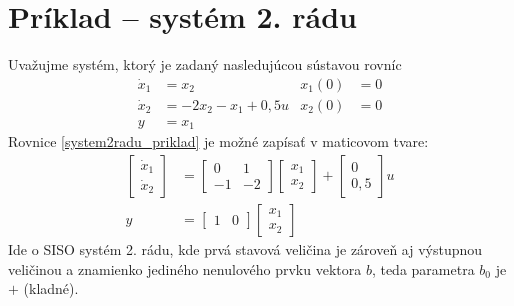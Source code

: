 \documentclass[a4paper, 10pt, ]{article}
\begin{document}
\section{Príklad -- systém 2. rádu}


Uvažujme systém, ktorý je zadaný nasledujúcou sústavou rovníc
\begin{subequations} \label{system2radu_priklad}
\begin{align}
	\dot x_1 &= x_2  &  x_1(0) &=0 \\
	\dot x_2 &= -2 x_2 - x_1 + 0,5 u &  x_2(0)&=0 \\
	y &= x_1
\end{align}
\end{subequations}
Rovnice \eqref{system2radu_priklad} je možné zapísať v maticovom tvare:
\begin{subequations} \label{maticformasystemu2r_priklad}
	\begin{align}
	\begin{bmatrix}
	 		\dot x_1  \\
	 		\dot x_2
	 \end{bmatrix}
	 &=
	 \begin{bmatrix}
	 		0 & 1 \\
	 		-1 & -2
	 \end{bmatrix}
	 \begin{bmatrix}
	 		x_1  \\
	 		x_2
	 \end{bmatrix}
	 +
	 \begin{bmatrix}
	 		0  \\
	 		0,5
	 \end{bmatrix}
	 u
	 \\
	 y
	 &=
	 \begin{bmatrix}
	 		1  &
	 		0
	 \end{bmatrix}
	 \begin{bmatrix}
	 		x_1  \\
	 		x_2
	 \end{bmatrix}
	\end{align}
\end{subequations}
Ide o SISO systém 2. rádu, kde prvá stavová veličina je zároveň aj výstupnou veličinou a znamienko jediného nenulového prvku vektora $b$, teda parametra $b_0$ je $+$ (kladné).
\end{document}
